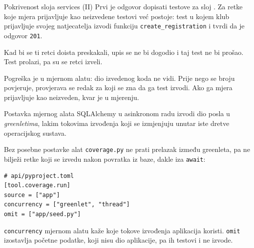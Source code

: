 \begin{frame}{Pokrivenost sloja services (II)}
Prvi je odgovor dopisati testove za sloj . Za retke koje mjera prijavljuje kao neizvedene testovi već postoje: test u kojem klub prijavljuje svojeg natjecatelja izvodi funkciju \texttt{create\_registration} i tvrdi da je odgovor \texttt{201}.

\vspace{0.9em}
Kad bi se ti retci doista preskakali, upis se ne bi dogodio i taj test ne bi prošao. Test prolazi, pa su se retci izveli.

\pause
\vspace{0.9em}
Pogreška je u mjernom alatu: dio izvedenog koda ne vidi. Prije nego se broju povjeruje, provjerava se redak za koji se zna da ga test izvodi. Ako ga mjera prijavljuje kao neizveden, kvar je u mjerenju.
\end{frame}

\begin{frame}[fragile]{Postavka mjernog alata}
SQLAlchemy u asinkronom radu izvodi dio posla u \emph{greenletima}, lakim tokovima izvođenja koji se izmjenjuju unutar iste dretve operacijskog sustava.

\vspace{0.5em}
Bez posebne postavke alat \texttt{coverage.py} ne prati prelazak između greenleta, pa ne bilježi retke koji se izvedu nakon povratka iz baze, dakle iza \texttt{await}:

\begin{lstlisting}
# api/pyproject.toml
[tool.coverage.run]
source = ["app"]
concurrency = ["greenlet", "thread"]
omit = ["app/seed.py"]
\end{lstlisting}

\vspace{0.3em}
\texttt{concurrency} mjernom alatu kaže koje tokove izvođenja aplikacija koristi. \texttt{omit} izostavlja početne podatke, koji nisu dio aplikacije, pa ih testovi i ne izvode.
\end{frame}

